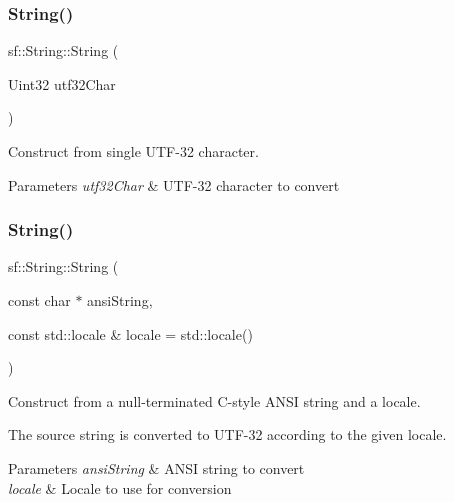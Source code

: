 \subsubsection{\texorpdfstring{String()}{String()}\hspace{0.1cm}{\footnotesize\ttfamily [4/11]}}
{\footnotesize\ttfamily sf\+::\+String\+::\+String (\begin{DoxyParamCaption}\item[{Uint32}]{utf32\+Char }\end{DoxyParamCaption})}



Construct from single U\+T\+F-\/32 character. 


\begin{DoxyParams}{Parameters}
{\em utf32\+Char} & U\+T\+F-\/32 character to convert \\
\hline
\end{DoxyParams}
\mbox{\label{classsf_1_1_string_a57d2b8c289f9894f859564cad034bfc7}} 
\subsubsection{\texorpdfstring{String()}{String()}\hspace{0.1cm}{\footnotesize\ttfamily [5/11]}}
{\footnotesize\ttfamily sf\+::\+String\+::\+String (\begin{DoxyParamCaption}\item[{const char $\ast$}]{ansi\+String,  }\item[{const std\+::locale \&}]{locale = {\ttfamily std\+:\+:locale()} }\end{DoxyParamCaption})}



Construct from a null-\/terminated C-\/style A\+N\+SI string and a locale. 

The source string is converted to U\+T\+F-\/32 according to the given locale.


\begin{DoxyParams}{Parameters}
{\em ansi\+String} & A\+N\+SI string to convert \\
\hline
{\em locale} & Locale to use for conversion \\
\hline
\end{DoxyParams}
\mbox{\label{classsf_1_1_string_a0aa41dcbd17b0c36c74d03d3b0147f1e}} 
